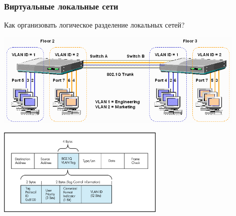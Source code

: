 \documentclass[utf8]{beamer}
\begin{document}
\begin{frame}
\frametitle{Виртуальные локальные сети}
Как организовать логическое разделение локальных сетей?
\begin{center}
\includegraphics[width=0.9\textwidth]{pic/vlan.png}
\end{center}
\begin{center}
\includegraphics[width=0.6\textwidth]{pic/vlan-header.png}
\end{center}
\end{frame}
\end{document}
